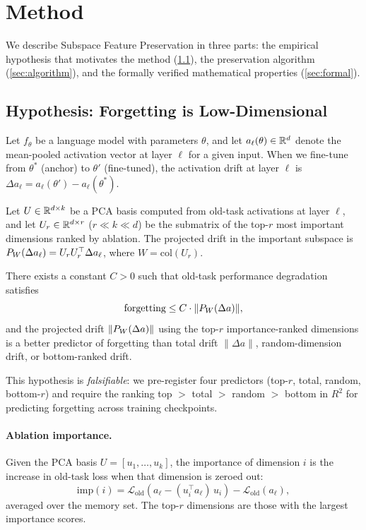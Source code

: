 \section{Method}
\label{sec:method}

We describe Subspace Feature Preservation in three parts: the empirical hypothesis that motivates the method (\cref{sec:hypothesis}), the preservation algorithm (\cref{sec:algorithm}), and the formally verified mathematical properties (\cref{sec:formal}).

\subsection{Hypothesis: Forgetting is Low-Dimensional}
\label{sec:hypothesis}

Let $f_\theta$ be a language model with parameters $\theta$, and let $a_\ell(\theta) \in \mathbb{R}^d$ denote the mean-pooled activation vector at layer $\ell$ for a given input.
When we fine-tune from $\theta^*$ (anchor) to $\theta'$ (fine-tuned), the activation drift at layer $\ell$ is $\Delta a_\ell = a_\ell(\theta') - a_\ell(\theta^*)$.

Let $U \in \mathbb{R}^{d \times k}$ be a PCA basis computed from old-task activations at layer $\ell$, and let $U_r \in \mathbb{R}^{d \times r}$ ($r \ll k \ll d$) be the submatrix of the top-$r$ most important dimensions ranked by ablation.
The projected drift in the important subspace is $P_W(\Delta a_\ell) = U_r U_r^\top \Delta a_\ell$, where $W = \text{col}(U_r)$.

\begin{hypothesis}
\label{hyp:h1}
There exists a constant $C > 0$ such that old-task performance degradation satisfies
\begin{equation}
    \text{forgetting} \leq C \cdot \| P_W(\Delta a) \|,
    \label{eq:h1}
\end{equation}
and the projected drift $\| P_W(\Delta a) \|$ using the top-$r$ importance-ranked dimensions is a better predictor of forgetting than total drift $\| \Delta a \|$, random-dimension drift, or bottom-ranked drift.
\end{hypothesis}

This hypothesis is \emph{falsifiable}: we pre-register four predictors (top-$r$, total, random, bottom-$r$) and require the ranking top $>$ total $>$ random $>$ bottom in $R^2$ for predicting forgetting across training checkpoints.

\paragraph{Ablation importance.}
Given the PCA basis $U = [u_1, \ldots, u_k]$, the importance of dimension $i$ is the increase in old-task loss when that dimension is zeroed out:
\begin{equation}
    \text{imp}(i) = \mathcal{L}_{\text{old}}\!\left(a_\ell - (u_i^\top a_\ell)\, u_i\right) - \mathcal{L}_{\text{old}}(a_\ell),
    \label{eq:importance}
\end{equation}
averaged over the memory set.
The top-$r$ dimensions are those with the largest importance scores.

